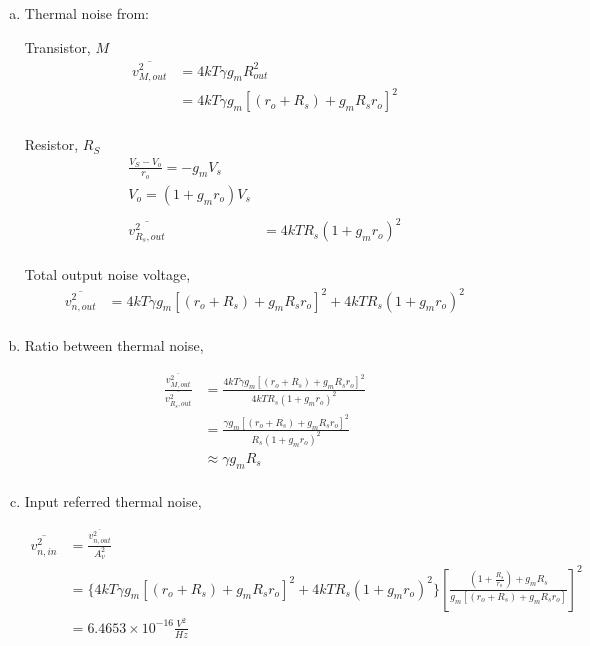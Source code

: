 \documentclass{article}
\begin{document}
\begin{enumerate}[(a)]
\item Thermal noise from:

Transistor, \(M\)
\begin{equation*}
\begin{aligned}
\overline{v_{M, out}^2} &= 4kT\gamma{}g_{m}R_{out}^{2} \\
&= 4kT\gamma{}g_{m}[(r_{o} + R_{s}) + g_{m}R_{s}r_{o}]^{2} \\
\end{aligned}
\end{equation*}

Resistor, \(R_{S}\)
\begin{equation*}
\begin{aligned}
\frac{V_{S} - V_{o}}{r_{o}} = -g_{m}V_{s} \\
V_{o} = (1 + g_{m}r_{o})V_{s} \\
\\
\overline{v_{R_{s}, out}^2} &= 4kTR_{s}(1 + g_{m}r_{o})^{2} \\
\end{aligned}
\end{equation*}

Total output noise voltage,
\begin{equation*}
\begin{aligned}
\overline{v_{n, out}^2} &= 4kT\gamma{}g_{m}[(r_{o} + R_{s}) + g_{m}R_{s}r_{o}]^{2} + 4kTR_{s}(1 + g_{m}r_{o})^{2} \\
\end{aligned}
\end{equation*}

\item Ratio between thermal noise,

\begin{equation*}
\begin{aligned}
\frac{\overline{v_{M, out}^2}}{\overline{v_{R_{s}, out}^2}} &= \frac{4kT\gamma{}g_{m}[(r_{o} + R_{s}) + g_{m}R_{s}r_{o}]^{2}}{4kTR_{s}(1 + g_{m}r_{o})^{2}} \\
&= \frac{\gamma{}g_{m}[(r_{o} + R_{s}) + g_{m}R_{s}r_{o}]^{2}}{R_{s}(1 + g_{m}r_{o})^{2}} \\
&\approx \gamma{}g_{m}R_{s} \\
\end{aligned}
\end{equation*}

\item Input referred thermal noise,

\begin{equation*}
\begin{aligned}
\overline{v_{n, in}^2} &= \frac{\overline{v_{n, out}^2}}{A_{v}^{2}} \\
&= \{4kT\gamma{}g_{m}[(r_{o} + R_{s}) + g_{m}R_{s}r_{o}]^{2} + 4kTR_{s}(1 + g_{m}r_{o})^{2}\}[\frac{(1 + \frac{R_{s}}{r_{o}}) + g_{m}R_{s}}{g_{m}[(r_{o} + R_{s}) + g_{m}R_{s}r_{o}]}]^{2}\\
&= 6.4653 \times 10^{-16} \frac{V^{2}}{Hz}
\end{aligned}
\end{equation*}
\end{enumerate}
\end{document}
